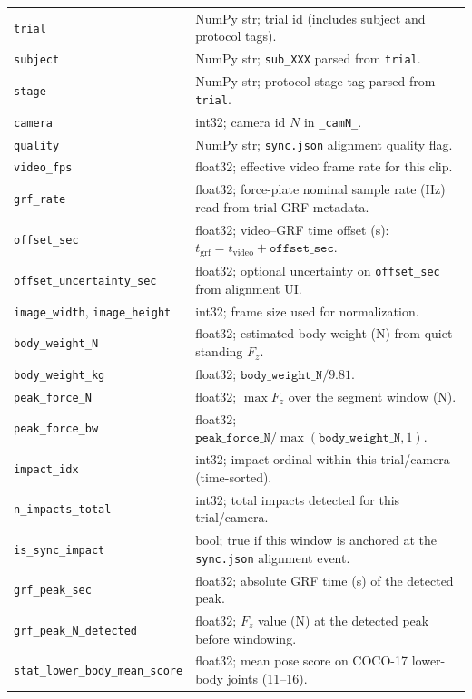 \documentclass[sigconf,screen]{acmart}
\begin{document}
\begin{table}[t]
\begin{tabularx}{\columnwidth}{@{}lX@{}}
    \texttt{trial} & NumPy str; trial id (includes subject and protocol tags). \\
    \texttt{subject} & NumPy str; \texttt{sub\_XXX} parsed from \texttt{trial}. \\
    \texttt{stage} & NumPy str; protocol stage tag parsed from \texttt{trial}. \\
    \texttt{camera} & int32; camera id \(N\) in \texttt{\_camN\_}. \\
    \texttt{quality} & NumPy str; \texttt{sync.json} alignment quality flag. \\
    \texttt{video\_fps} & float32; effective video frame rate for this clip. \\
    \texttt{grf\_rate} & float32; force-plate nominal sample rate (Hz) read from trial GRF metadata. \\
    \texttt{offset\_sec} & float32; video--GRF time offset (s): \(t_{\text{grf}}=t_{\text{video}}+\texttt{offset\_sec}\). \\
    \texttt{offset\_uncertainty\_sec} & float32; optional uncertainty on \texttt{offset\_sec} from alignment UI. \\
    \texttt{image\_width}, \texttt{image\_height} & int32; frame size used for normalization. \\
    \texttt{body\_weight\_N} & float32; estimated body weight (N) from quiet standing \(F_z\). \\
    \texttt{body\_weight\_kg} & float32; \(\texttt{body\_weight\_N}/9.81\). \\
    \texttt{peak\_force\_N} & float32; \(\max F_z\) over the segment window (N). \\
    \texttt{peak\_force\_bw} & float32; \(\texttt{peak\_force\_N}/\max(\texttt{body\_weight\_N},1)\). \\
    \texttt{impact\_idx} & int32; impact ordinal within this trial/camera (time-sorted). \\
    \texttt{n\_impacts\_total} & int32; total impacts detected for this trial/camera. \\
    \texttt{is\_sync\_impact} & bool; true if this window is anchored at the \texttt{sync.json} alignment event. \\
    \texttt{grf\_peak\_sec} & float32; absolute GRF time (s) of the detected peak. \\
    \texttt{grf\_peak\_N\_detected} & float32; \(F_z\) value (N) at the detected peak before windowing. \\
    \texttt{stat\_lower\_body\_mean\_score} & float32; mean pose score on COCO-17 lower-body joints (11--16). \\

\end{tabularx}
\end{table}
\end{document}

